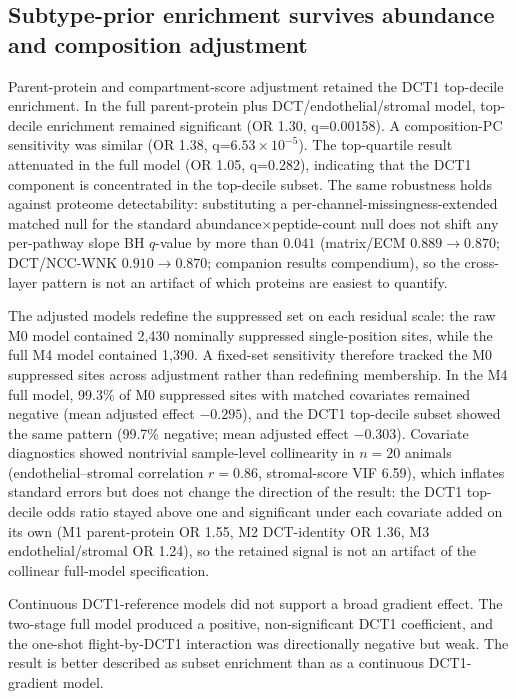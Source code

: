 \documentclass[11pt]{article}
\begin{document}
\subsection{Subtype-prior enrichment survives abundance and composition adjustment}

Parent-protein and compartment-score adjustment retained the DCT1 top-decile enrichment. In the full parent-protein plus DCT/endothelial/stromal model, top-decile enrichment remained significant (OR 1.30, q=0.00158). A composition-PC sensitivity was similar (OR 1.38, q=$6.53\times10^{-5}$). The top-quartile result attenuated in the full model (OR 1.05, q=0.282), indicating that the DCT1 component is concentrated in the top-decile subset. The same robustness holds against proteome detectability: substituting a per-channel-missingness-extended matched null for the standard abundance$\times$peptide-count null does not shift any per-pathway slope BH $q$-value by more than $0.041$ (matrix/ECM $0.889\to0.870$; DCT/NCC-WNK $0.910\to0.870$; companion results compendium), so the cross-layer pattern is not an artifact of which proteins are easiest to quantify.

The adjusted models redefine the suppressed set on each residual scale: the raw M0 model contained 2,430 nominally suppressed single-position sites, while the full M4 model contained 1,390. A fixed-set sensitivity therefore tracked the M0 suppressed sites across adjustment rather than redefining membership. In the M4 full model, 99.3\% of M0 suppressed sites with matched covariates remained negative (mean adjusted effect $-0.295$), and the DCT1 top-decile subset showed the same pattern (99.7\% negative; mean adjusted effect $-0.303$). Covariate diagnostics showed nontrivial sample-level collinearity in $n=20$ animals (endothelial--stromal correlation $r=0.86$, stromal-score VIF 6.59), which inflates standard errors but does not change the direction of the result: the DCT1 top-decile odds ratio stayed above one and significant under each covariate added on its own (M1 parent-protein OR 1.55, M2 DCT-identity OR 1.36, M3 endothelial/stromal OR 1.24), so the retained signal is not an artifact of the collinear full-model specification.

Continuous DCT1-reference models did not support a broad gradient effect. The two-stage full model produced a positive, non-significant DCT1 coefficient, and the one-shot flight-by-DCT1 interaction was directionally negative but weak. The result is better described as subset enrichment than as a continuous DCT1-gradient model.
\end{document}

